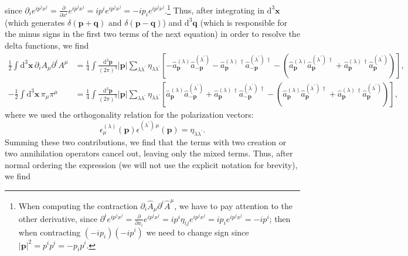 since \(\partial_i e^{i p^j x^j} = \frac{\partial}{\partial x^i} e^{i p^j x^j} = i p^i e^{i p^j x^j} = -i p_i e^{i p^j x^j}\).\footnote{When computing the contraction \(\partial_i \hat{A}_{\mu}\partial^i \hat{A}^{\mu}\), we have to pay attention to the other derivative, since \(\partial^i e^{i p^j x^j} = \frac{\partial}{\partial x_i} e^{i p^j x^j} = i p^i \eta_{ij} e^{i p^j x^j} = i p_i e^{i p^j x^j} = -i p^i\); then when contracting \((-i p_i) (-i p^i)\) we need to change sign since \(\vert \mathbf{p} \vert^2 = p^i p^i = - p_i p^i\).} Thus, after integrating in \(\mathrm{d}^3 \mathbf{x}\) (which generates \(\delta(\mathbf{p}+ \mathbf{q})\) and \(\delta(\mathbf{p}-\mathbf{q})\)) and \(\mathrm{d}^3 \mathbf{q}\) (which is responsible for the minus signs in the first two terms of the next equation) in order to resolve the delta functions, we find
\[
    \begin{aligned}
        \frac{1}{2} \int \mathrm{d}^3 \mathbf{x} \, \partial_i A_{\mu} \partial^i A^{\mu} & = \frac{1}{4} \int \frac{\mathrm{d}^3 \mathbf{p}}{(2\pi)^3} \vert \mathbf{p} \vert \sum_{\lambda \lambda^{\prime}} \eta_{\lambda \lambda^{\prime}} \left[ - \hat{a}^{(\lambda)}_{\mathbf{p}} \hat{a}^{(\lambda^{\prime})}_{-\mathbf{p}} - \hat{a}^{(\lambda)\,\dagger}_{\mathbf{p}} \hat{a}^{(\lambda^{\prime})\,\dagger}_{-\mathbf{p}} - \left( \hat{a}^{(\lambda)}_{\mathbf{p}} \hat{a}^{(\lambda^{\prime})\,\dagger}_{\mathbf{p}} + \hat{a}^{(\lambda)\,\dagger}_{\mathbf{p}} \hat{a}^{(\lambda^{\prime})}_{\mathbf{p}} \right) \right], \\
        -\frac{1}{2} \int \mathrm{d}^3 \mathbf{x} \, \pi_{\mu} \pi^{\mu}                  & = \frac{1}{4} \int \frac{\mathrm{d}^3 \mathbf{p}}{(2\pi)^3} \vert \mathbf{p} \vert \sum_{\lambda \lambda^{\prime}} \eta_{\lambda \lambda^{\prime}} \left[ \hat{a}^{(\lambda)}_{\mathbf{p}} \hat{a}^{(\lambda^{\prime})}_{-\mathbf{p}} + \hat{a}^{(\lambda)\,\dagger}_{\mathbf{p}} \hat{a}^{(\lambda^{\prime})\,\dagger}_{-\mathbf{p}} - \left( \hat{a}^{(\lambda)}_{\mathbf{p}} \hat{a}^{(\lambda^{\prime})\,\dagger}_{\mathbf{p}} + \hat{a}^{(\lambda)\,\dagger}_{\mathbf{p}} \hat{a}^{(\lambda^{\prime})}_{\mathbf{p}} \right) \right],
    \end{aligned}
\]
where we used the orthogonality relation for the polarization vectors:
\[
    \epsilon_{\mu}^{(\lambda)}(\mathbf{p}) \epsilon^{(\lambda^{\prime})\,\mu}(\mathbf{p}) = \eta_{\lambda \lambda^{\prime}}.
\]
Summing these two contributions, we find that the terms with two creation or two annihilation operators cancel out, leaving only the mixed terms. Thus, after normal ordering the expression (we will not use the explicit notation for brevity), we find
